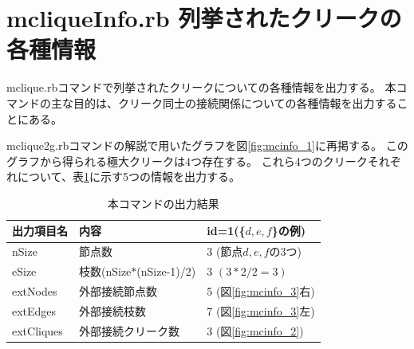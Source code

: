 
\section{mcliqueInfo.rb 列挙されたクリークの各種情報\label{sect:mcliqueInfo}}

mclique.rbコマンドで列挙されたクリークについての各種情報を出力する。
本コマンドの主な目的は、クリーク同士の接続関係についての各種情報を出力することにある。

mclique2g.rbコマンドの解説で用いたグラフを図\ref{fig:mcinfo_1}に再掲する。
このグラフから得られる極大クリークは4つ存在する。
これら4つのクリークそれぞれについて、表\ref{tbl:mcinfo_1}に示す5つの情報を出力する。

\begin{table}[htbp]
\begin{center}
\caption{本コマンドの出力結果\label{tbl:mcinfo_1}}
\begin{tabular}{lll}
\hline
出力項目名&内容&id=1(\{$d,e,f$\}の例) \\
\hline
nSize      & 節点数                    & 3 (節点$d,e,f$の3つ)\\
eSize      & 枝数(nSize$*$(nSize-1)/2) & 3 $(3*2/2=3)$\\
extNodes   & 外部接続節点数            & 5 (図\ref{fig:mcinfo_3}右) \\
extEdges   & 外部接続枝数              & 7 (図\ref{fig:mcinfo_3}左) \\
extCliques & 外部接続クリーク数        & 3 (図\ref{fig:mcinfo_2}) \\
\hline
\end{tabular} 
\end{center}
\end{table}


